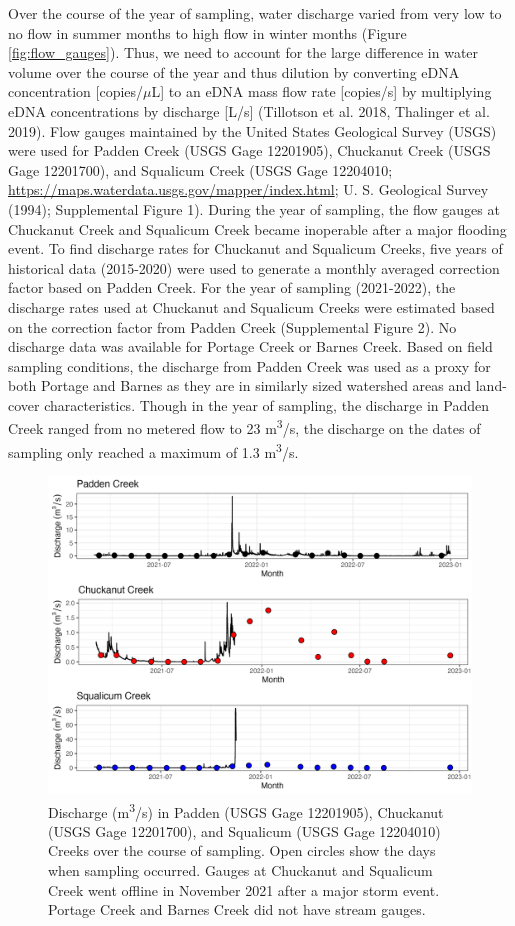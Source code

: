 \documentclass[
]{article}
\begin{document}
Over the course of the year of sampling, water discharge varied from
very low to no flow in summer months to high flow in winter months
(Figure \ref{fig:flow_gauges}). Thus, we need to account for the large
difference in water volume over the course of the year and thus dilution
by converting eDNA concentration {[}copies/\(\mu\)L{]} to an eDNA mass
flow rate {[}copies/s{]} by multiplying eDNA concentrations by discharge
{[}L/s{]} (Tillotson et al. 2018, Thalinger et al. 2019). Flow gauges
maintained by the United States Geological Survey (USGS) were used for
Padden Creek (USGS Gage 12201905), Chuckanut Creek (USGS Gage 12201700),
and Squalicum Creek (USGS Gage 12204010;
\url{https://maps.waterdata.usgs.gov/mapper/index.html}; U. S.
Geological Survey (1994); Supplemental Figure 1). During the year of
sampling, the flow gauges at Chuckanut Creek and Squalicum Creek became
inoperable after a major flooding event. To find discharge rates for
Chuckanut and Squalicum Creeks, five years of historical data
(2015-2020) were used to generate a monthly averaged correction factor
based on Padden Creek. For the year of sampling (2021-2022), the
discharge rates used at Chuckanut and Squalicum Creeks were estimated
based on the correction factor from Padden Creek (Supplemental Figure
2). No discharge data was available for Portage Creek or Barnes Creek.
Based on field sampling conditions, the discharge from Padden Creek was
used as a proxy for both Portage and Barnes as they are in similarly
sized watershed areas and land-cover characteristics. Though in the year
of sampling, the discharge in Padden Creek ranged from no metered flow
to 23 m\textsuperscript{3}/s, the discharge on the dates of sampling
only reached a maximum of 1.3 m\textsuperscript{3}/s.

\begin{figure}
\centering
\includegraphics{../Output/Figures/flow_gauges.png}
\caption{Discharge (m\textsuperscript{3}/s) in Padden (USGS Gage
12201905), Chuckanut (USGS Gage 12201700), and Squalicum (USGS Gage
12204010) Creeks over the course of sampling. Open circles show the days
when sampling occurred. Gauges at Chuckanut and Squalicum Creek went
offline in November 2021 after a major storm event. Portage Creek and
Barnes Creek did not have stream gauges.\label{fig:flows}}
\end{figure}
\end{document}
